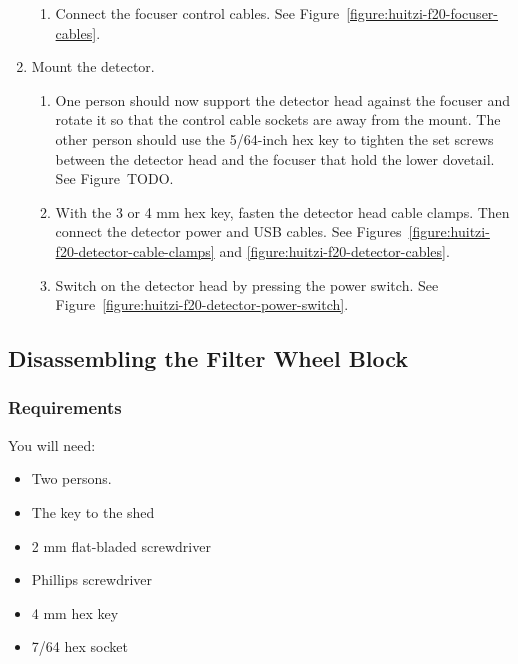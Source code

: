 \begin{enumerate}
\begin{enumerate}
  \item Connect the focuser control cables. See Figure~\ref{figure:huitzi-f20-focuser-cables}.
  
\end{enumerate}


\item Mount the detector.

\begin{enumerate}    

  \item One person should now support the detector head against the focuser and rotate it so that the control cable sockets are away from the mount. The other person should use the 5/64-inch hex key to tighten the set screws between the detector head and the focuser that hold the lower dovetail. See Figure~TODO.

  \item With the 3 or 4 mm hex key, fasten the detector head cable clamps. Then connect the detector power and USB cables. See Figures~\ref{figure:huitzi-f20-detector-cable-clamps} and \ref{figure:huitzi-f20-detector-cables}.

  \item Switch on the detector head by pressing the power switch. See Figure~\ref{figure:huitzi-f20-detector-power-switch}.  

\end{enumerate}

\end{enumerate}

\subsection{Disassembling the Filter Wheel Block}

\subsubsection{Requirements}

You will need:

\begin{itemize}
    \item Two persons.
    \item The key to the shed
    \item 2 mm flat-bladed screwdriver
    \item Phillips screwdriver
    \item 4 mm hex key
    \item 7/64 hex socket
\end{itemize}

